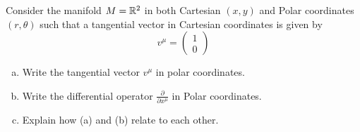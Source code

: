 \documentclass{article}
\begin{document}
 			\begin{exe}
 				Consider the manifold $M = \mathbb{R}^2$ in both Cartesian $(x,y)$ and Polar coordinates $(r, \theta)$ such that a tangential vector in Cartesian coordinates is given by
 				$$ v^\mu = \begin{pmatrix}
 					1 \\ 0
 				\end{pmatrix}$$
 			\begin{enumerate}[(a)]
 				\item Write the tangential vector $v^{\mu}$ in polar coordinates.
 				\item Write the differential operator $\frac{\partial}{\partial x^\mu}$ in Polar coordinates.
 				\item Explain how (a) and (b) relate to each other.
 			\end{enumerate}
 			
 			\end{exe}
\end{document}
